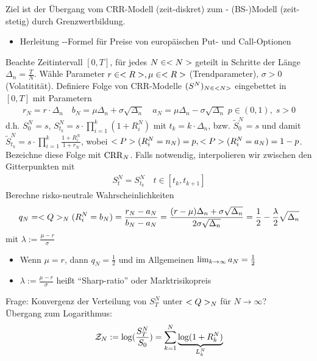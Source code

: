Ziel ist der Übergang vom CRR-Modell (zeit-diskret) zum - (BS-)Modell (zeit-stetig) durch Grenzwertbildung.
\begin{itemize}
	\item Herleitung --Formel für Preise von europäischen Put- und Call-Optionen
\end{itemize}
Beachte Zeitintervall $[0,T]$, für jedes $N \in \N$ geteilt in Schritte der Länge $\Delta_n = \frac{T}{N}$. Wähle Parameter $r \in \R, \mu \in \R$ (Trendparameter), $\sigma > 0$ (Volatitität). Definiere Folge von CRR-Modelle $(S^N)_{N \in \N}$ eingebettet in $[0,T]$ mit Parametern
\begin{align*}
	r_N = r \cdot \Delta_n \quad b_N = \mu \Delta_n + \sigma \sqrt{\Delta_n}\quad a_N = \mu \Delta_n - \sigma \sqrt{\Delta_n}\;p \in (0,1),\;s> 0
\end{align*}
d.h. $S^N_0 = s$, $S^N_{t_k} = s \cdot \prod_{i=1}^k (1+R_i^N)$ mit $t_k = k \cdot \Delta_n$, bzw. $\tilde{S}_0^N = s$ und damit $\tilde{S}^N_{t_k}= s \cdot \prod_{i=1}^k \frac{1+R_i^N}{1+r_N}$, wobei $\P(R^N_i = n_N) = p, \P(R^N_i = a_N) = 1-p$.
Bezeichne diese Folge mit $\CRR_N$. Falls notwendig, interpolieren wir zwischen den Gitterpunkten mit
\begin{align*}
	S_t^N = S^N_{t_k} \quad t \in [t_k,t_{k+1}]
\end{align*}
Berechne risko-neutrale Wahrscheinlichkeiten
\begin{align*}
	q_N = \QQ_N(R_i^N = b_N) = \frac{r_N - a_N}{b_N - a_N} = \frac{(r-\mu)\Delta_n + \sigma \sqrt{\Delta_n}}{2\sigma\sqrt{\Delta_n}} = \frac{1}{2} - \frac{\lambda}{2}\sqrt{\Delta_n}
\end{align*}
mit $\lambda := \frac{\mu - r}{\sigma}$
\begin{*remark}
	\begin{itemize}
		\item Wenn $\mu = r$, dann $q_N = \frac{1}{2}$ und im Allgemeinen $\lim_{k \to \infty}a_N = \half$
		\item $\lambda := \frac{\mu - r}{\sigma}$ heißt ``Sharp-ratio'' oder Marktrisikopreis
	\end{itemize}
\end{*remark}
Frage: Konvergenz der Verteilung von $S^N_T$ unter $\QQ_N$ für $N \to \infty$?\\
Übergang zum Logarithmus:
\begin{align*}
	\ZZ_N := \log(\frac{S^N_T}{S_0}) = \sum_{k=1}^N \underbrace{\log(1+R_k^N)}_{L^N_k}
\end{align*}
